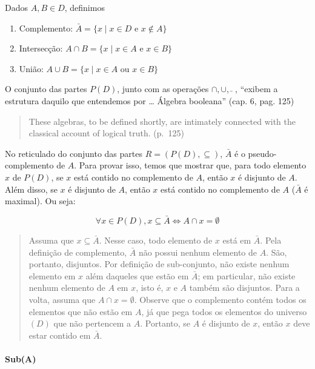 Dados \(A, B \in D\), definimos

\begin{enumerate}
\def\labelenumi{\arabic{enumi}.}
\tightlist
\item
  Complemento: \(\bar{A} = \{x \mid x \in D\) e \(x \not\in A\}\)
\item
  Intersecção: \(A \cap B = \{ x \mid x \in A\) e \(x \in B \}\)
\item
  União: \(A \cup B = \{ x \mid x \in A\) ou \(x \in B \}\)
\end{enumerate}

O conjunto das partes \(P(D)\), junto com as operações
\(\cap, \cup, \bar{}\) , ``exibem a estrutura daquilo que entendemos por
\ldots{} Álgebra booleana'' (cap. 6, pag. 125)

\begin{quote}
These algebras, to be defined shortly, are intimately connected with the
classical account of logical truth. (p.~125)
\end{quote}

No reticulado do conjunto das partes \(R = (P(D), \subseteq)\),
\(\bar{A}\) é o pseudo-complemento de \(A\). Para provar isso, temos que
mostrar que, para todo elemento \(x\) de \(P(D)\), se \(x\) está contido
no complemento de \(A\), então \(x\) é disjunto de \(A\). Além disso, se
\(x\) é disjunto de \(A\), então \(x\) está contido no complemento de
\(A\) (\(\bar{A}\) é maximal). Ou seja:

\[
    \forall x \in P(D), x \subseteq \bar{A} \Leftrightarrow A \cap x = \emptyset
\]

\begin{quote}
Assuma que \(x \subseteq \bar{A}\). Nesse caso, todo elemento de \(x\)
está em \(\bar{A}\). Pela definição de complemento, \(\bar{A}\) não
possui nenhum elemento de \(A\). São, portanto, disjuntos. Por definição
de sub-conjunto, não existe nenhum elemento em \(x\) além daqueles que
estão em \(\bar{A}\); em particular, não existe nenhum elemento de \(A\)
em \(x\), isto é, \(x\) e \(A\) também são disjuntos. Para a volta,
assuma que \(A \cap x = \emptyset\). Observe que o complemento contém
todos os elementos que não estão em \(A\), já que pega todos os
elementos do universo \((D)\) que não pertencem a \(A\). Portanto, se
\(A\) é disjunto de \(x\), então \(x\) deve estar contido em
\(\bar{A}\).
\end{quote}

\hypertarget{suba}{%
\paragraph{Sub(A)}\label{suba}}

